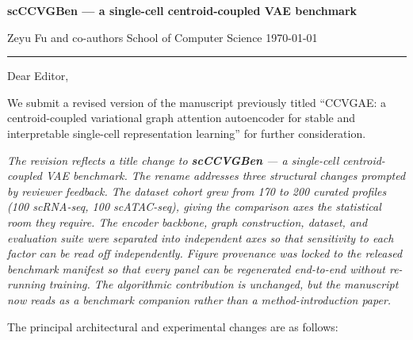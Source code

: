 \documentclass[11pt]{article}
\begin{document}
\noindent
{\sffamily\bfseries\large\color{rrheader}
  scCCVGBen --- a single-cell centroid-coupled VAE benchmark}

\smallskip
\noindent
{\sffamily Zeyu Fu and co-authors \quad\textperiodcentered\quad
  School of Computer Science \quad\textperiodcentered\quad \today}

\vspace{4pt}
\noindent\textcolor{rrheader}{\rule{\linewidth}{0.6pt}}
\vspace{10pt}

Dear Editor,

We submit a revised version of the manuscript previously titled
``CCVGAE: a centroid-coupled variational graph attention autoencoder for
stable and interpretable single-cell representation learning'' for further
consideration.

\medskip

{\itshape
The revision reflects a title change to \textbf{scCCVGBen} --- a single-cell
centroid-coupled VAE benchmark. The rename addresses three structural changes
prompted by reviewer feedback. The dataset cohort grew from 170 to 200
curated profiles (100 scRNA-seq, 100 scATAC-seq), giving the comparison axes
the statistical room they require. The encoder backbone, graph construction,
dataset, and evaluation suite were separated into independent axes so that
sensitivity to each factor can be read off independently. Figure provenance
was locked to the released benchmark manifest so that every panel can be
regenerated end-to-end without re-running training. The algorithmic
contribution is unchanged, but the manuscript now reads as a benchmark
companion rather than a method-introduction paper.}

\medskip

The principal architectural and experimental changes are as follows:
\end{document}
